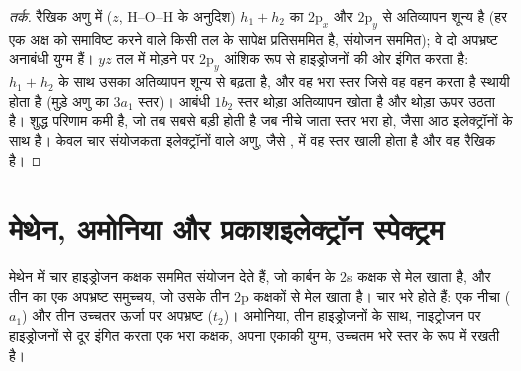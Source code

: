 \begin{proof}[तर्क]
रैखिक अणु में ($z$, H--O--H के अनुदिश) $h_1 + h_2$ का
$2\mathrm p_x$ और $2\mathrm p_y$ से अतिव्यापन शून्य है (हर एक अक्ष को समाविष्ट करने वाले किसी तल के सापेक्ष
प्रतिसममित है, संयोजन सममित); वे दो अपभ्रष्ट
अनाबंधी युग्म हैं। $yz$ तल में मोड़ने पर $2\mathrm p_y$ आंशिक रूप से
हाइड्रोजनों की ओर इंगित करता है: $h_1 + h_2$ के साथ उसका अतिव्यापन शून्य से बढ़ता है, और वह भरा स्तर
जिसे वह वहन करता है स्थायी होता है (मुड़े अणु का $3a_1$ स्तर)। आबंधी
$1b_2$ स्तर थोड़ा अतिव्यापन खोता है और थोड़ा ऊपर उठता है। शुद्ध परिणाम कमी है,
जो तब सबसे बड़ी होती है जब नीचे जाता स्तर भरा हो, जैसा आठ इलेक्ट्रॉनों के साथ है।
केवल चार संयोजकता इलेक्ट्रॉनों वाले अणु, जैसे , में वह स्तर
खाली होता है और वह रैखिक है।
\end{proof}

\section{मेथेन, अमोनिया और प्रकाशइलेक्ट्रॉन स्पेक्ट्रम}

मेथेन में चार हाइड्रोजन कक्षक सममित संयोजन देते हैं, जो
कार्बन के 2s कक्षक से मेल खाता है, और तीन का एक अपभ्रष्ट समुच्चय, जो
उसके तीन 2p कक्षकों से मेल खाता है। चार  भरे होते हैं: एक नीचा ($a_1$) और तीन
उच्चतर ऊर्जा पर अपभ्रष्ट ($t_2$)। अमोनिया, तीन हाइड्रोजनों के साथ, नाइट्रोजन पर
हाइड्रोजनों से दूर इंगित करता एक भरा कक्षक, अपना एकाकी युग्म, उच्चतम भरे स्तर के रूप में
रखती है।

